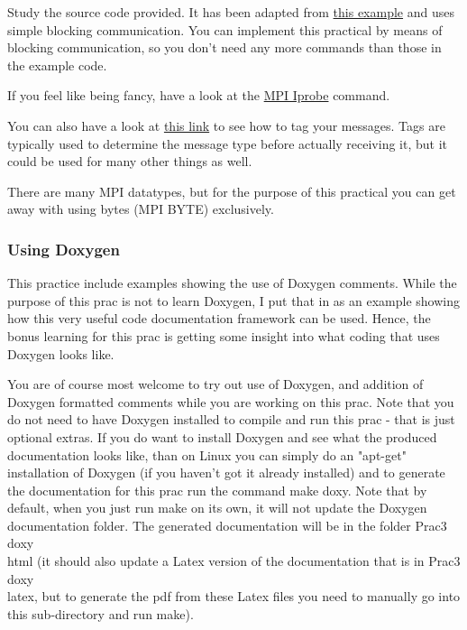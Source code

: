 Study the source code provided. It has been adapted from \href{https://en.wikipedia.org/wiki/Message_Passing_Interface#Example_program}{this example} and uses simple blocking communication. You can implement this practical by means of blocking communication, so you don’t need any more commands than those in the example code. 

If you feel like being fancy, have a look at the \href{https://mpi.deino.net/mpi_functions/MPI_Iprobe.html}{MPI Iprobe} command. 

You can also have a look at \href{http://stackoverflow.com/questions/12637550/using-mpibyte-to-receive-any-data-type}{this link} to see how to tag your messages. Tags are typically used to determine the message type before actually receiving it, but it could be used for many other things as well. 

There are many MPI datatypes, but for the purpose of this practical you can get away with using bytes (MPI BYTE) exclusively.

\subsubsection{Using Doxygen}

This practice include examples showing the use of Doxygen comments. While the purpose of this prac is not to learn Doxygen, I put that in as an example showing how this very useful code documentation framework can be used. Hence, the bonus learning for this prac is getting some insight into what coding that uses Doxygen looks like.

You are of course most welcome to try out use of Doxygen, and addition of Doxygen formatted comments while you are working on this prac. Note that you do not need to have Doxygen installed to compile and run this prac - that is just optional extras. 
If you do want to install Doxygen and see what the produced documentation looks like, than on Linux you can simply do an "apt-get" installation of Doxygen (if you haven't got it already installed) and to generate the documentation for this prac run the command make doxy. Note that by default, when you just run make on its own, it will not update the Doxygen documentation folder. The generated documentation will be in the folder Prac3\\doxy\\html (it should also update a Latex version of the documentation that is in Prac3\\doxy\\latex, but to generate the pdf from these Latex files you need to manually go into this sub-directory and run make).

